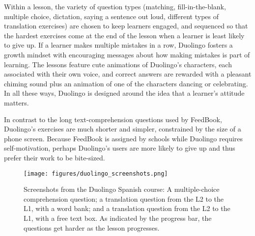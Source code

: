 
Within a lesson, the variety of question types (matching, fill-in-the-blank, multiple choice, dictation, saying a sentence out loud, different types of translation exercises) are chosen to keep learners engaged, and sequenced so that the hardest exercises come at the end of the lesson when a learner is least likely to give up.  If a learner makes multiple mistakes in a row, Duolingo fosters a growth mindset with encouraging messages about how making mistakes is part of learning.  The lessons feature cute animations of Duolingo's characters, each associated with their own voice, and correct answers are rewarded with a pleasant chiming sound plus an animation of one of the characters dancing or celebrating.  In all these ways, Duolingo is designed around the idea that a learner's attitude matters.

In contrast to the long text-comprehension questions used by FeedBook, Duolingo's exercises are much shorter and simpler, constrained by the size of a phone screen.  Because FeedBook is assigned by schools while Duolingo requires self-motivation, perhaps Duolingo's users are more likely to give up and thus prefer their work to be bite-sized.



\begin{figure}[htb!]
  \centering
  \texttt{[image: figures/duolingo\_screenshots.png]}
\caption{Screenshots from the Duolingo Spanish course: A multiple-choice comprehension question; a translation question from the L2 to the L1, with a word bank; and a translation question from the L2 to the L1, with a free text box.  As indicated by the progress bar, the questions get harder as the lesson progresses.}
\end{figure}



